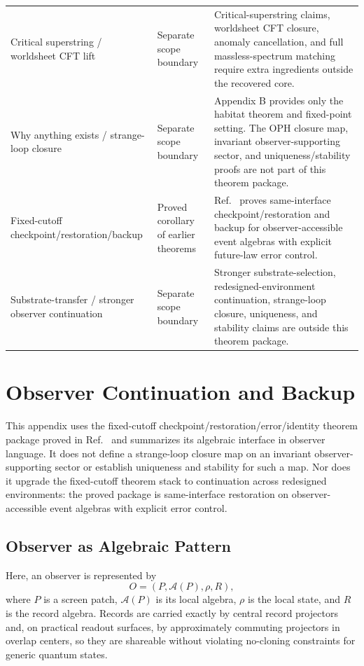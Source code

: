 \begin{center}
\begin{tabular}{@{}>{\raggedright\arraybackslash}p{}>{\raggedright\arraybackslash}p{}>{\raggedright\arraybackslash}p{}@{}}
Critical superstring / worldsheet CFT lift & Separate scope boundary & Critical-superstring claims, worldsheet CFT closure, anomaly cancellation, and full massless-spectrum matching require extra ingredients outside the recovered core. \\
Why anything exists / strange-loop closure & Separate scope boundary & Appendix B provides only the habitat theorem and fixed-point setting. The OPH closure map, invariant observer-supporting sector, and uniqueness/stability proofs are not part of this theorem package. \\
Fixed-cutoff checkpoint/restoration/backup & Proved corollary of earlier theorems & Ref.~\cite{ophmicrophysics} proves same-interface checkpoint/restoration and backup for observer-accessible event algebras with explicit future-law error control. \\
Substrate-transfer / stronger observer continuation & Separate scope boundary & Stronger substrate-selection, redesigned-environment continuation, strange-loop closure, uniqueness, and stability claims are outside this theorem package. \\
\bottomrule
\end{tabular}
\end{center}

\section{Observer Continuation and Backup}

This appendix uses the fixed-cutoff checkpoint/restoration/error/identity theorem package proved
in Ref.~\cite{ophmicrophysics} and summarizes its algebraic interface in observer language. It
does not define a strange-loop closure map on an invariant observer-supporting sector or establish
uniqueness and stability for such a map. Nor does it upgrade the fixed-cutoff theorem stack to
continuation across redesigned environments: the proved package is same-interface restoration on
observer-accessible event algebras with explicit error control.

\subsection{Observer as Algebraic Pattern}

Here, an observer is represented by
\[
O=(P,\mathcal{A}(P),\rho,R),
\]
where \(P\) is a screen patch, \(\mathcal{A}(P)\) is its local algebra, \(\rho\) is the local
state, and \(R\) is the record algebra. Records are carried exactly by central record projectors
and, on practical readout surfaces, by approximately commuting projectors in overlap centers, so
they are shareable without violating no-cloning constraints for generic quantum states.

